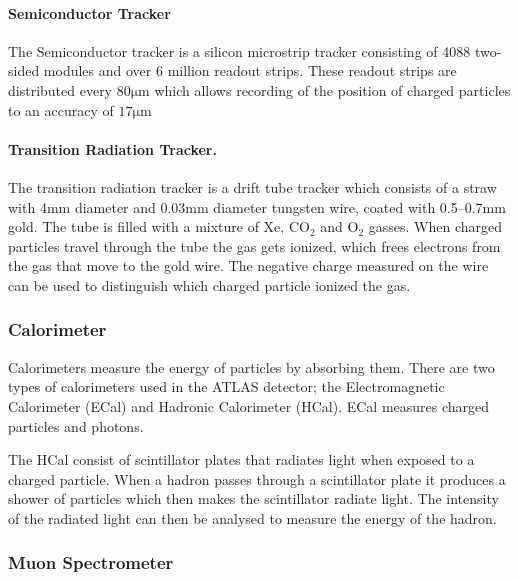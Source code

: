 \documentclass[12pt,a4paper]{article}
\numberwithin{equation}{section}
\begin{document}
\paragraph{Semiconductor Tracker}
The Semiconductor tracker is a silicon microstrip tracker consisting of 4088
two-sided modules and over 6 million readout strips. These readout strips are
distributed every $80\mathrm{\mu m}$ which allows recording of the position of
charged particles to an accuracy of $17\mathrm{\mu m}$

\paragraph{Transition Radiation Tracker.}
The transition radiation tracker is a drift tube tracker which consists of a
straw with 4mm diameter and 0.03mm diameter tungsten wire, coated with 0.5--0.7mm
gold. The tube is filled with a mixture of Xe, $\mathrm{CO_2}$ and
$\mathrm{O_2}$ gasses. When charged particles travel through the tube the gas gets ionized, which frees electrons from the gas that move to the gold wire. The negative charge measured on the wire can be used to distinguish which charged particle ionized the gas. \cite{ATLAS-ID}


\subsubsection{Calorimeter}
Calorimeters measure the energy of particles by absorbing them. There are two
types of calorimeters used in the ATLAS detector; the Electromagnetic
Calorimeter (ECal) and Hadronic Calorimeter (HCal). ECal measures charged
particles and photons.

The HCal consist of scintillator plates that radiates light when exposed to a
charged particle. When a hadron passes through a scintillator plate it produces
a shower of particles which then makes the scintillator radiate light. The
intensity of the radiated light can then be analysed to measure the energy of
the hadron. \cite{detector-vid}


\subsubsection{Muon Spectrometer}
\end{document}
